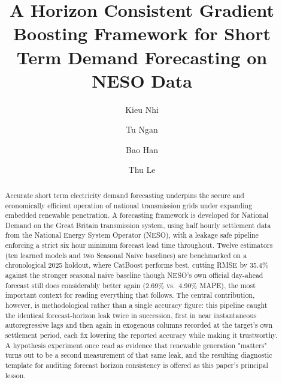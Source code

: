 \documentclass[runningheads]{llncs}
\begin{document}
%
\title{A Horizon Consistent Gradient Boosting Framework for Short Term Demand Forecasting on NESO Data}
%
%
\author{Kieu Nhi \and
Tu Ngan \and
Bao Han \and
Thu Le }
%
\maketitle
%
\begin{abstract}
Accurate short term electricity demand forecasting underpins the secure and economically efficient operation of national transmission grids under expanding embedded renewable penetration. A forecasting framework is developed for National Demand on the Great Britain transmission system, using half hourly settlement data from the National Energy System Operator (NESO), with a leakage safe pipeline enforcing a strict six hour minimum forecast lead time throughout. Twelve estimators (ten learned models and two Seasonal Naive baselines) are benchmarked on a chronological 2025 holdout, where CatBoost performs best, cutting RMSE by 35.4\% against the stronger seasonal naive baseline though NESO's own official day-ahead forecast still does considerably better again (2.69\% vs.\ 4.90\% MAPE), the most important context for reading everything that follows. The central contribution, however, is methodological rather than a single accuracy figure: this pipeline caught the identical forecast-horizon leak twice in succession, first in near instantaneous autoregressive lags and then again in exogenous columns recorded at the target's own settlement period, each fix lowering the reported accuracy while making it trustworthy. A hypothesis experiment once read as evidence that renewable generation "matters" turns out to be a second measurement of that same leak, and the resulting diagnostic template for auditing forecast horizon consistency is offered as this paper's principal lesson.
\end{abstract}
\end{document}
